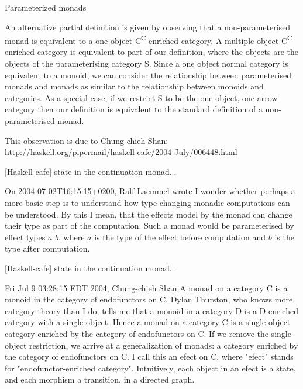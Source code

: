 \documentclass{beamer}
\begin{document}
    \begin{frame}[fragile]{Parameterized monads}
        \begin{definition}
            An alternative partial definition is given by observing that a non-parameterised monad is equivalent to a one object C\textsuperscript{C}-enriched category. A multiple object C\textsuperscript{C} enriched category is equivalent to part of our definition, where the objects are the objects of the parameterising category S. Since a one object normal category
            is equivalent to a monoid, we can consider the relationship between parameterised monads and monads as similar to the relationship between monoids and categories. As a special case, if we restrict S to be the one object, one arrow category then our definition is equivalent to the standard definition of a non-parameterised monad.
        \end{definition}
        This observation is due to Chung-chieh Shan: \\
        \url{http://haskell.org/pipermail/haskell-cafe/2004-July/006448.html}
    \end{frame}

    \begin{frame}[fragile]{[Haskell-cafe] state in the continuation monad...}
        \begin{block}{On 2004-07-02T16:15:15+0200, Ralf Laemmel wrote}
            I wonder whether perhaps a more basic step is to understand
            how type-changing monadic computations can be understood.
            By this I mean, that the effects model by the monad can change
            their type as part of the computation. Such a monad would be
            parameterised by effect types $a$ $b$, where $a$ is the type of the
            effect \alert{before} computation and $b$ is the
            type \alert{after} computation.
        \end{block}
    \end{frame}

    \begin{frame}[fragile]{[Haskell-cafe] state in the continuation monad...}
        \begin{block}{Fri Jul 9 03:28:15 EDT 2004, Chung-chieh Shan}
            A monad on a category C is a monoid in the category of endofunctors on
            C. Dylan Thurston, who knows more category theory than I do, tells me
            that a monoid in a category D is a D-enriched category with a single
            object. Hence a monad on a category C is a single-object category
            enriched by the category of endofunctors on C. If we remove the
            single-object restriction, we arrive at a generalization of monads: a
            category enriched by the category of endofunctors on C. I call this an
            \alert{efect} on C, where "efect" stands for \alert{"endofunctor-enriched category"}.
            Intuitively, each object in an efect is a state, and each morphism a
            transition, in a directed graph.
        \end{block}
    \end{frame}
\end{document}
